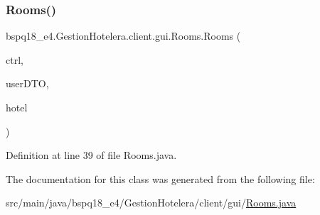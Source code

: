 \subsubsection{\texorpdfstring{Rooms()}{Rooms()}}
{\footnotesize\ttfamily bspq18\+\_\+e4.\+Gestion\+Hotelera.\+client.\+gui.\+Rooms.\+Rooms (\begin{DoxyParamCaption}\item[{\mbox{\hyperlink{classbspq18__e4_1_1_gestion_hotelera_1_1client_1_1controller_1_1_controller}{Controller}}}]{ctrl,  }\item[{\mbox{\hyperlink{classbspq18__e4_1_1_gestion_hotelera_1_1server_1_1dto_1_1_user_d_t_o}{User\+D\+TO}}}]{user\+D\+TO,  }\item[{\mbox{\hyperlink{classbspq18__e4_1_1_gestion_hotelera_1_1server_1_1data_1_1_hotel}{Hotel}}}]{hotel }\end{DoxyParamCaption})}



Definition at line 39 of file Rooms.\+java.



The documentation for this class was generated from the following file\+:\begin{DoxyCompactItemize}
\item 
src/main/java/bspq18\+\_\+e4/\+Gestion\+Hotelera/client/gui/\mbox{\hyperlink{_rooms_8java}{Rooms.\+java}}\end{DoxyCompactItemize}
